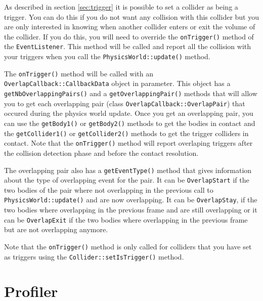 \documentclass[a4paper,12pt]{article}
\begin{document}
    As described in section \ref{sec:trigger} it is possible to set a collider as being a trigger. You can do this if you do not want any collision with
    this collider but you are only interested in knowing when another collider enters or exit the volume of the collider. If you do this, you will need
    to override the \texttt{onTrigger()} method of the \texttt{EventListener}. This method will be called and report all the collision with your triggers
    when you call the \texttt{PhysicsWorld::update()} method. \\

    \begin{sloppypar}
    The \texttt{onTrigger()} method will be called with an \texttt{OverlapCallback::CallbackData} object in parameter. This object has a
    \texttt{getNbOverlappingPairs()} and a \texttt{getOverlappingPair()} methods that will allow you to get each overlapping pair (class
    \texttt{OverlapCallback::OverlapPair}) that occured during the physics world update. Once you get an overlapping pair, you can use
    the \texttt{getBody1()} or \texttt{getBody2()} methods to get the bodies in
    contact and the \texttt{getCollider1()} or \texttt{getCollider2()} methods to get the trigger colliders in contact.
    Note that the \texttt{onTrigger()} method will report overlaping triggers after the collision detection phase and before the contact resolution. \\
    \end{sloppypar}

    \begin{sloppypar}
    The overlapping pair also has a \texttt{getEventType()} method that gives information about the type of overlapping event for the pair. It can be
    \texttt{OverlapStart} if the two bodies of the pair where not overlapping in the previous call to \texttt{PhysicsWorld::update()} and are now
    overlapping. It can be \texttt{OverlapStay}, if the two bodies where overlapping in the previous frame and are still overlapping or it can be
    \texttt{OverlapExit} if the two bodies where overlapping in the previous frame but are not overlapping anymore. 
    \end{sloppypar}

    Note that the \texttt{onTrigger()} method is only called for colliders that you have set as triggers using the \texttt{Collider::setIsTrigger()} method.

    \section{Profiler}
    \label{sec:profiler}
\end{document}
